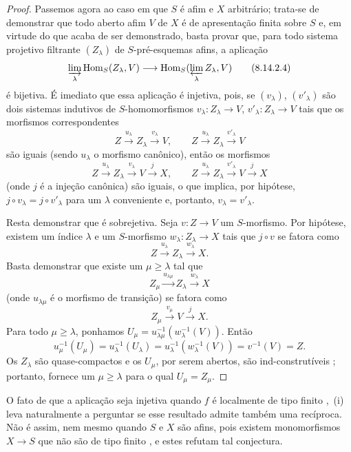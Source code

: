 \begin{proof}
Passemos agora ao caso em que $S$ é afim e $X$ arbitrário; trata-se de demonstrar que todo aberto afim $V$ de $X$ é de apresentação finita sobre $S$ e, em virtude do que acaba de ser demonstrado, basta provar que, para todo sistema projetivo filtrante $(Z_\lambda)$ de $S$-pré-esquemas afins, a aplicação
\begin{equation}
\label{IV.8.14.2.4}
\varinjlim_\lambda\operatorname{Hom}_S(Z_\lambda,V)\to\operatorname{Hom}_S(\varprojlim_\lambda Z_\lambda,V) \tag{8.14.2.4}
\end{equation}
é bijetiva.
É imediato que essa aplicação é injetiva, pois, se $(v_\lambda)$, $(v'_\lambda)$ são dois sistemas indutivos de $S$-homomorfismos $v_\lambda:Z_\lambda\to V$, $v'_\lambda:Z_\lambda\to V$ tais que os morfismos correspondentes
\[
Z\xrightarrow{u_\lambda}Z_\lambda\xrightarrow{v_\lambda}V,\qquad
Z\xrightarrow{u_\lambda}Z_\lambda\xrightarrow{v'_\lambda}V
\]
são iguais (sendo $u_\lambda$ o morfismo canônico), então os morfismos
\[
Z\xrightarrow{u_\lambda}Z_\lambda\xrightarrow{v_\lambda}V\xrightarrow{j}X,\qquad Z\xrightarrow{u_\lambda}Z_\lambda\xrightarrow{v'_\lambda}V\xrightarrow{j}X
\]
(onde $j$ é a injeção canônica) são iguais, o que implica, por hipótese, $j\circ v_\lambda=j\circ v'_\lambda$ para um $\lambda$ conveniente e, portanto, $v_\lambda=v'_\lambda$.


Resta demonstrar que  é sobrejetiva.
Seja $v:Z\to V$ um $S$-morfismo.
Por hipótese, existem um índice $\lambda$ e um $S$-morfismo
$w_\lambda:Z_\lambda\to X$ tais que $j\circ v$ se fatora como
\[
 Z\xrightarrow{u_\lambda}Z_\lambda\xrightarrow{w_\lambda}X.
\]
Basta demonstrar que existe um $\mu\geqslant\lambda$ tal que
\[
 Z_\mu\xrightarrow{u_{\lambda\mu}}Z_\lambda\xrightarrow{w_\lambda}X
\]
(onde $u_{\lambda\mu}$ é o morfismo de transição) se fatora como
\[
 Z_\mu\xrightarrow{v_\mu}V\xrightarrow{j}X.
\]
Para todo $\mu\geqslant\lambda$, ponhamos
$U_\mu=u_{\lambda\mu}^{-1}(w_\lambda^{-1}(V))$.
Então
\[
 u_\mu^{-1}(U_\mu)=u_\lambda^{-1}(U_\lambda)
 =u_\lambda^{-1}(w_\lambda^{-1}(V))
 =v^{-1}(V)=Z.
\]
Os $Z_\lambda$ são quase-compactos e os $U_\mu$, por serem abertos, são
ind-construtíveis ; portanto,  fornece um
$\mu\geqslant\lambda$ para o qual $U_\mu=Z_\mu$.
\end{proof}

\begin{remark}[8.14.3]
\label{IV.8.14.3}
O fato de que a aplicação  seja injetiva quando $f$ é localmente de tipo
finito ,~(i) leva naturalmente a perguntar se esse resultado admite também uma recíproca.
Não é assim, nem mesmo quando $S$ e $X$ são afins, pois existem monomorfismos
$X\to S$ que não são de tipo finito , e estes refutam tal
conjectura.
\end{remark}

